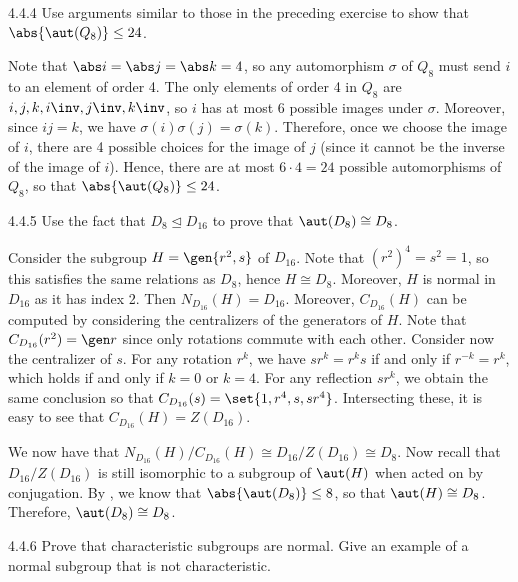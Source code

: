 \begin{exercise}{4.4.4}
	Use arguments similar to those in the preceding exercise to show that $\abs{\aut(Q_8)} \leq 24$.
\end{exercise}

\begin{sol}
	Note that $\abs i = \abs j = \abs k = 4$, so any automorphism $\sigma$ of $Q_8$ must send $i$ to an element of order 4.
	The only elements of order 4 in $Q_8$ are $i, j, k, i\inv, j\inv, k\inv$, so $i$ has at most 6 possible images under $\sigma$.
	Moreover, since $ij = k$, we have $\sigma(i)\sigma(j) = \sigma(k)$.
	Therefore, once we choose the image of $i$, there are 4 possible choices for the image of $j$ (since it cannot be the inverse of the image of $i$).
	Hence, there are at most $6 \cdot 4 = 24$ possible automorphisms of $Q_8$, so that $\abs{\aut(Q_8)} \leq 24$.
\end{sol}

\begin{exercise}{4.4.5}
	Use the fact that $D_8 \trianglelefteq D_{16}$ to prove that $\aut(D_8) \cong D_8$.
\end{exercise}

\begin{sol}
	Consider the subgroup $H = \gen{r^2, s}$ of $D_{16}$.
	Note that $(r^2)^4 = s^2 = 1$, so this satisfies the same relations as $D_8$, hence $H \cong D_8$.
	Moreover, $H$ is normal in $D_{16}$ as it has index 2.
	Then $N_{D_{16}}(H) = D_{16}$.
	Moreover, $C_{D_{16}}(H)$ can be computed by considering the centralizers of the generators of $H$.
	Note that $C_{D_{16}}(r^2) = \gen r$ since only rotations commute with each other.
	Consider now the centralizer of $s$.
	For any rotation $r^k$, we have $sr^k = r^ks$ if and only if $r^{-k} = r^k$, which holds if and only if $k = 0$ or $k = 4$.
	For any reflection $sr^k$, we obtain the same conclusion so that $C_{D_{16}}(s) = \set{1, r^4, s, sr^4}$.
	Intersecting these, it is easy to see that $C_{D_{16}}(H) = Z(D_{16})$.

	We now have that $N_{D_{16}}(H)/C_{D_{16}}(H) \cong D_{16}/Z(D_{16}) \cong D_8$.
	Now recall that $D_{16}/Z(D_{16})$ is still isomorphic to a subgroup of $\aut(H)$ when acted on by conjugation.
	By , we know that $\abs{\aut(D_8)} \leq 8$, so that $\aut(H) \cong D_8$.
	Therefore, $\aut(D_8) \cong D_8$.
\end{sol}

\begin{exercise}{4.4.6}
	Prove that characteristic subgroups are normal.
	Give an example of a normal subgroup that is not characteristic.
\end{exercise}

